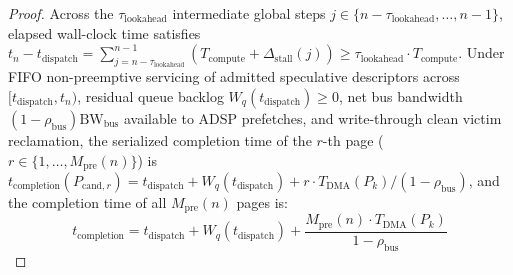 \documentclass[conference,10pt]{IEEEtran}
\begin{document}
\begin{proof}
Across the $\tau_{\text{lookahead}}$ intermediate global steps $j \in \{n - \tau_{\text{lookahead}}, \dots, n-1\}$, elapsed wall-clock time satisfies $t_n - t_{\text{dispatch}} = \sum_{j=n-\tau_{\text{lookahead}}}^{n-1} (T_{\text{compute}} + \Delta_{\text{stall}}(j)) \ge \tau_{\text{lookahead}} \cdot T_{\text{compute}}$. Under FIFO non-preemptive servicing of admitted speculative descriptors across $[t_{\text{dispatch}}, t_n)$, residual queue backlog $W_q(t_{\text{dispatch}}) \ge 0$, net bus bandwidth $(1 - \rho_{\text{bus}})\text{BW}_{\text{bus}}$ available to ADSP prefetches, and write-through clean victim reclamation, the serialized completion time of the $r$-th page ($r \in \{1, \dots, M_{\text{pre}}(n)\}$) is $t_{\text{completion}}(P_{\text{cand}, r}) = t_{\text{dispatch}} + W_q(t_{\text{dispatch}}) + r \cdot T_{\text{DMA}}(P_k)/(1 - \rho_{\text{bus}})$, and the completion time of all $M_{\text{pre}}(n)$ pages is:
\begin{equation}
\label{eq:dma_completion}
t_{\text{completion}} = t_{\text{dispatch}} + W_q(t_{\text{dispatch}}) + \frac{M_{\text{pre}}(n) \cdot T_{\text{DMA}}(P_k)}{1 - \rho_{\text{bus}}}
\end{equation}

\end{proof}
\end{document}
